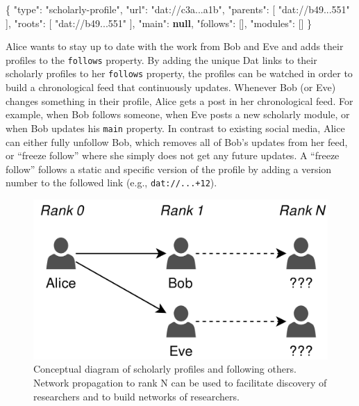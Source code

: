 \documentclass[a5paper]{book}
\newenvironment{Shaded}{\begin{snugshade}}{\end{snugshade}}
\newcommand{\KeywordTok}[1]{\textcolor[rgb]{0.13,0.29,0.53}{\textbf{#1}}}
\newcommand{\DataTypeTok}[1]{\textcolor[rgb]{0.13,0.29,0.53}{#1}}
\newcommand{\StringTok}[1]{\textcolor[rgb]{0.31,0.60,0.02}{#1}}
\newcommand{\OtherTok}[1]{\textcolor[rgb]{0.56,0.35,0.01}{#1}}
\newcommand{\FunctionTok}[1]{\textcolor[rgb]{0.00,0.00,0.00}{#1}}
\begin{document}
\begin{Shaded}
\begin{Highlighting}[]
\FunctionTok{\{}
  \DataTypeTok{"type"}\FunctionTok{:} \StringTok{"scholarly-profile"}\FunctionTok{,}
  \DataTypeTok{"url"}\FunctionTok{:} \StringTok{"dat://c3a...a1b"}\FunctionTok{,}
  \DataTypeTok{"parents"}\FunctionTok{:} \OtherTok{[} \StringTok{"dat://b49...551"} \OtherTok{]}\FunctionTok{,}
  \DataTypeTok{"roots"}\FunctionTok{:} \OtherTok{[} \StringTok{"dat://b49...551"} \OtherTok{]}\FunctionTok{,}
  \DataTypeTok{"main"}\FunctionTok{:} \KeywordTok{null}\FunctionTok{,}
  \DataTypeTok{"follows"}\FunctionTok{:} \OtherTok{[]}\FunctionTok{,}
  \DataTypeTok{"modules"}\FunctionTok{:} \OtherTok{[]}
\FunctionTok{\}}
\end{Highlighting}
\end{Shaded}

Alice wants to stay up to date with the work from Bob and Eve and adds
their profiles to the \texttt{follows} property. By adding the unique
Dat links to their scholarly profiles to her \texttt{follows} property,
the profiles can be watched in order to build a chronological feed that
continuously updates. Whenever Bob (or Eve) changes something in their
profile, Alice gets a post in her chronological feed. For example, when
Bob follows someone, when Eve posts a new scholarly module, or when Bob
updates his \texttt{main} property. In contrast to existing social
media, Alice can either fully unfollow Bob, which removes all of Bob's
updates from her feed, or \enquote{freeze follow} where she simply does
not get any future updates. A \enquote{freeze follow} follows a static
and specific version of the profile by adding a version number to the
followed link (e.g., \texttt{dat://...+12}).

\begin{figure}[h]

{\centering \includegraphics[width=0.7\linewidth]{assets/figures/datcom-fig3} 

}

\caption{Conceptual diagram of scholarly profiles and following others. Network propagation to rank N can be used to facilitate discovery of researchers and to build networks of researchers.}\label{fig:datcom-fig3}
\end{figure}
\end{document}
